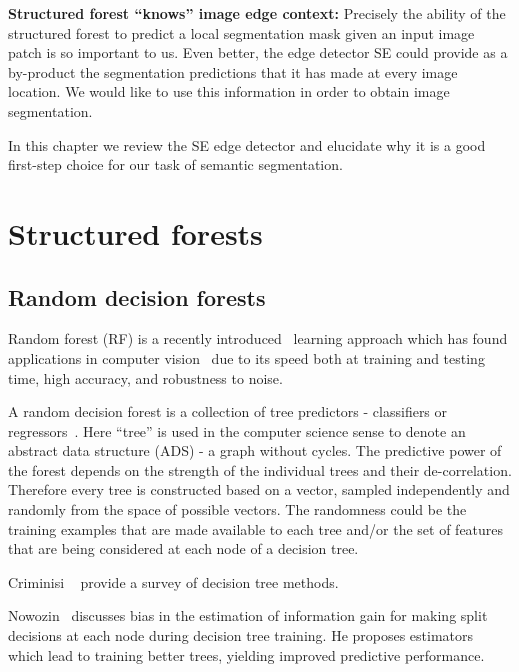 \textbf{Structured forest ``knows'' image edge context:} Precisely the ability of the structured forest to predict a local segmentation mask given an input image patch is so important to us. Even better, the edge detector SE could provide as a by-product the segmentation predictions that it has made at every image location. We would like to use this information in order to obtain image segmentation.

In this chapter we review the SE edge detector and elucidate why it is a good first-step choice for our task of semantic segmentation.

\section{Structured forests}
\subsection{Random decision forests}
Random forest (RF) is a recently introduced~\cite{Breiman01} learning approach which has found applications in computer vision~\cite{KontschiederBBP11,LimZD13,DollarICCV13edges,Dollar2015PAMI} due to its speed both at training and testing time, high accuracy, and robustness to noise.

A random decision forest is a collection %
of tree predictors - classifiers or regressors~\cite{breiman1984classification}. Here ``tree'' is used in the computer science sense to denote an abstract data structure (ADS) - a graph without cycles. 
The predictive power of the forest depends on the strength of the individual trees and their de-correlation. Therefore every tree is constructed based on a vector, sampled independently and randomly from the space of possible vectors. The randomness could be \wrt the training examples that are made available to each tree and\slash or the set of features that are being considered at each node of a decision tree.

Criminisi \etal~\cite{Criminisi12} provide a survey of decision tree methods.

Nowozin~\cite{Nowozin12improvedinformation,nowozin2014decision} discusses bias in the estimation of information gain for making split decisions at each node during decision tree training. He proposes estimators which lead to training better trees, yielding improved predictive performance.

